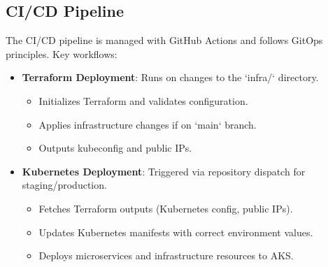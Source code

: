 \subsection{CI/CD Pipeline}
The CI/CD pipeline is managed with GitHub Actions and follows GitOps principles.
Key workflows:

\begin{itemize}
    \item \textbf{Terraform Deployment}: Runs on changes to the `infra/` directory.
    \begin{itemize}
        \item Initializes Terraform and validates configuration.
        \item Applies infrastructure changes if on `main` branch.
        \item Outputs kubeconfig and public IPs.
    \end{itemize}
    \item \textbf{Kubernetes Deployment}: Triggered via repository dispatch for staging/production.
    \begin{itemize}
        \item Fetches Terraform outputs (Kubernetes config, public IPs).
        \item Updates Kubernetes manifests with correct environment values.
        \item Deploys microservices and infrastructure resources to AKS.
    \end{itemize}
\end{itemize}
